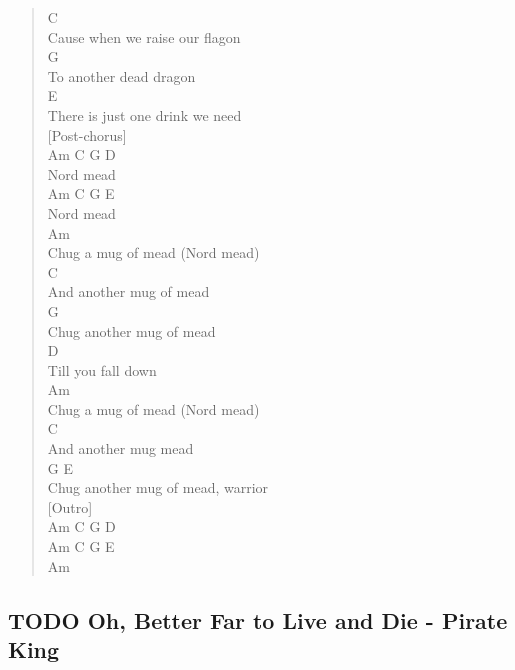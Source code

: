 \documentclass[11pt]{article}
\begin{document}
\begin{verse}
\hspace*{14em}C\\
Cause when we raise our flagon\\
\hspace*{5em}G\\
To another dead dragon\\
\hspace*{9em}E\\
There is just one drink we need\\
\vspace*{1em}
[Post-chorus]\\
\hspace*{5em}Am   C G D\\
Nord mead\\
\hspace*{5em}Am   C G E\\
Nord mead\\
\vspace*{1em}
Am\\
Chug a mug of mead (Nord mead)\\
\hspace*{5em}C\\
And another mug of mead\\
\hspace*{6em}G\\
Chug another mug of mead\\
\hspace*{9em}D\\
Till you fall down\\
\vspace*{1em}
Am\\
Chug a mug of mead (Nord mead)\\
\hspace*{5em}C\\
And another mug mead\\
\hspace*{6em}G                        E\\
Chug another mug of mead, warrior\\
\vspace*{1em}
[Outro]\\
Am C G D\\
Am C G E\\
\vspace*{1em}
Am\\
\end{verse}
\clearpage
\subsection{{\bfseries\sffamily TODO} Oh, Better Far to Live and Die - Pirate King}
\label{sec:org13f01cb}
\clearpage
\end{document}
